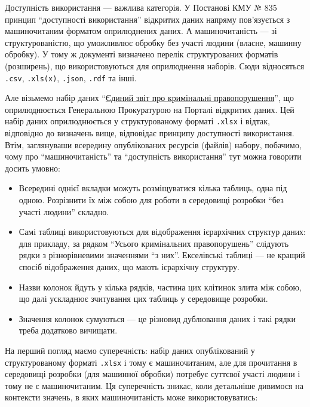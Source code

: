 \documentclass[
]{agujournal2019}
\providecommand{\tightlist}{%
  \setlength{\itemsep}{0pt}\setlength{\parskip}{0pt}}\usepackage{longtable,booktabs,array}
\begin{document}
Доступність використання --- важлива категорія. У Постанові КМУ № 835
принцип ``доступності використання'' відкритих даних напряму
пов'язується з машиночитаним форматом оприлюднених даних. А
машиночитаність --- зі структурованістю, що уможливлює обробку без
участі людини (власне, машинну обробку). У тому ж документі визначено
перелік структурованих форматів (розширень), що використовуються для
оприлюднення наборів. Сюди відносяться \texttt{.csv}, \texttt{.xls(x)},
\texttt{.json}, \texttt{.rdf} та інші.

Але візьмемо набір даних
``\href{https://data.gov.ua/dataset/8b9b1677-2407-454a-bfa7-76eb638c0ea1}{Єдиний
звіт про кримінальні правопорушення}'', що оприлюднюється Генеральною
Прокуратурою на Порталі відкритих даних. Цей набір даних оприлюднюється
у структурованому форматі \texttt{.xlsx} і відтак, відповідно до
визначень вище, відповідає принципу доступності використання. Втім,
заглянуваши всередину опублікованих ресурсів (файлів) набору, побачимо,
чому про ``машиночитаність'' та ``доступність використання'' тут можна
говорити досить умовно:

\begin{itemize}
\tightlist
\item
  Всередині однієї вкладки можуть розміщуватися кілька таблиць, одна під
  одною. Розрізнити їх між собою для роботи в середовищі розробки ``без
  участі людини'' складно.
\item
  Самі таблиці використовуються для відображення ієрархічних структур
  даних: для прикладу, за рядком ``Усього кримінальних правопорушень''
  слідують рядки з різнорівневими значеннями ``з них''. Екселівські
  таблиці --- не кращий спосіб відображення даних, що мають ієрархічну
  структуру.
\item
  Назви колонок йдуть у кілька рядків, частина цих клітинок злита між
  собою, що далі ускладнює зчитування цих таблиць у середовище розробки.
\item
  Значення колонок сумуються --- це різновид дублювання даних і такі
  рядки треба додатково вичищати.
\end{itemize}

На перший погляд маємо суперечність: набір даних опублікований у
структурованому форматі \texttt{.xlsx} і тому є машиночитаним, але для
прочитання в середовищі розробки (для машинної обробки) потребує
суттєвої участі людини і тому не є машиночитаним. Ця суперечність
зникає, коли детальніше дивимося на контексти значень, в яких
машиночитаність може використовуватись:
\end{document}
